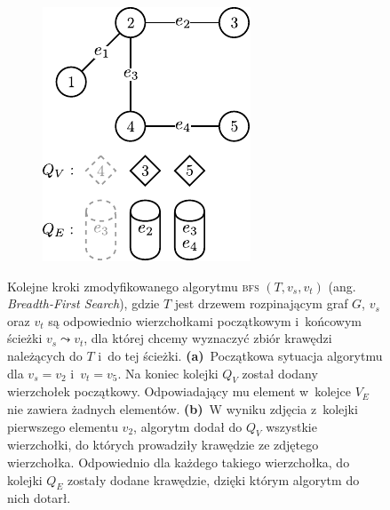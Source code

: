 \begin{savenotes}
\begin{figure}[!h]
\begin{subfigure}[b]{0.24\textwidth}
			\caption{}
			\label{fig:bfsExample:c}
		\end{subfigure}
		\hfill
		\begin{subfigure}[b]{0.24\textwidth}
			\includegraphics[width=\textwidth]{Chapter_V/BFS-example/d}
			\caption{}
			\label{fig:bfsExample:d}
		\end{subfigure}
		\hfill\null
		\caption[Kolejne kroki zmodyfikowanego algorytmu \textsc{bfs} $\left( T, v_{s}, v_{t} \right)$]{
			Kolejne kroki zmodyfikowanego algorytmu \textsc{bfs} $\left( T, v_{s}, v_{t} \right)$ (ang. \textit{Breadth-First Search}), gdzie $T$ jest drzewem rozpinającym graf $G$, $v_{s}$ oraz $v_{t}$ są odpowiednio wierzchołkami początkowym i~końcowym ścieżki $v_{s} \leadsto v_{t}$, dla której chcemy wyznaczyć zbiór krawędzi należących do $T$ i~do tej ścieżki.
			\textbf{(a)}~Początkowa sytuacja algorytmu dla $v_{s} = v_{2}$ i~$v_{t} = v_{5}$. Na koniec kolejki $Q_{V}$ został dodany wierzchołek początkowy. Odpowiadający mu element w~kolejce $V_{E}$ nie zawiera żadnych elementów.
			\textbf{(b)}~W wyniku zdjęcia z~kolejki pierwszego elementu $v_{2}$, algorytm dodał do $Q_{V}$ wszystkie wierzchołki, do których prowadziły krawędzie ze zdjętego wierzchołka. Odpowiednio dla każdego takiego wierzchołka, do kolejki $Q_{E}$ zostały dodane krawędzie, dzięki którym algorytm do nich dotarł.
}
\end{figure}
\end{savenotes}

